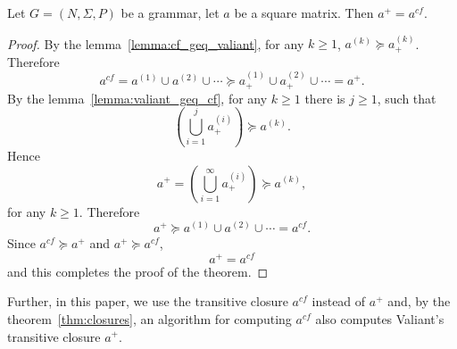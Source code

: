 \begin{mytheorem}\label{thm:closures}
	Let $G =(N,\Sigma,P)$ be a grammar, let $a$ be a square matrix. Then $a^+ = a^{cf}$.
\end{mytheorem}
\begin{proof}
	
	By the lemma~\ref{lemma:cf_geq_valiant}, for any $k \geq 1$, $a^{(k)} \succeq a^{(k)}_+$. Therefore $$a^{cf} = a^{(1)} \cup a^{(2)} \cup \cdots \succeq a^{(1)}_+ \cup a^{(2)}_+ \cup \cdots = a^+.$$ By the lemma~\ref{lemma:valiant_geq_cf}, for any $k \geq 1$ there is $j \geq 1$, such that $$(\bigcup^{j}_{i=1}{a^{(i)}_+}) \succeq a^{(k)}.$$ Hence $$a^+ = (\bigcup^{\infty}_{i=1}{a^{(i)}_+}) \succeq a^{(k)},$$ for any $k \geq 1$. Therefore $$a^+ \succeq a^{(1)} \cup a^{(2)} \cup \cdots = a^{cf}.$$ Since $a^{cf} \succeq a^+$ and $a^+ \succeq a^{cf}$, $$a^+ = a^{cf}$$ and this completes the proof of the theorem.
\end{proof}

Further, in this paper, we use the transitive closure $a^{cf}$ instead of $a^+$ and, by the theorem~\ref{thm:closures}, an algorithm for computing $a^{cf}$ also computes Valiant's transitive closure $a^+$.
